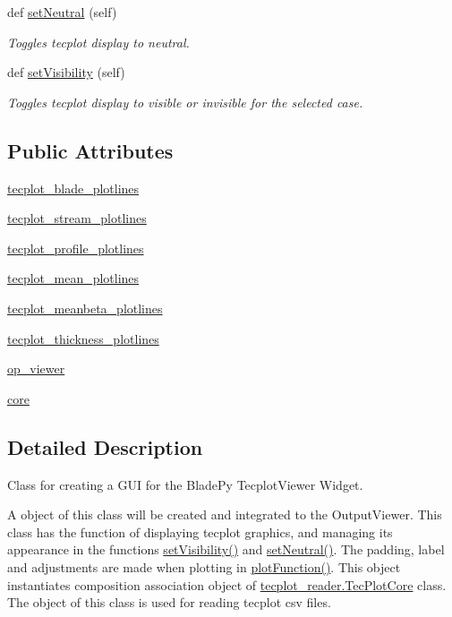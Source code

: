\begin{DoxyCompactItemize}
def \hyperlink{a00110_ad80163041f7884f536d1421860c4adc2}{set\+Neutral} (self)
\begin{DoxyCompactList}\small\item\em Toggles tecplot display to neutral. \end{DoxyCompactList}\item 
def \hyperlink{a00110_ae50e0f3c4051d791ed30a2e9de5233ea}{set\+Visibility} (self)
\begin{DoxyCompactList}\small\item\em Toggles tecplot display to visible or invisible for the selected case. \end{DoxyCompactList}\end{DoxyCompactItemize}
\subsection*{Public Attributes}
\begin{DoxyCompactItemize}
\item 
\hyperlink{a00110_a97bc6a6c7074f874028cd2afbbad4082}{tecplot\+\_\+blade\+\_\+plotlines}
\item 
\hyperlink{a00110_a103d285631a0d45198d834c8a98cf72a}{tecplot\+\_\+stream\+\_\+plotlines}
\item 
\hyperlink{a00110_a20a9b77de151d414f78ab14a5ee30143}{tecplot\+\_\+profile\+\_\+plotlines}
\item 
\hyperlink{a00110_ad430a4835103d6c1e22b1d81a829bc74}{tecplot\+\_\+mean\+\_\+plotlines}
\item 
\hyperlink{a00110_a552371e32854caef73cb7386140ebab8}{tecplot\+\_\+meanbeta\+\_\+plotlines}
\item 
\hyperlink{a00110_a3291e8bf0c5c69a20e3e9299dc363db2}{tecplot\+\_\+thickness\+\_\+plotlines}
\item 
\hyperlink{a00110_a03539a28f4d15d303da92341074ab6b6}{op\+\_\+viewer}
\item 
\hyperlink{a00110_a7d3fabc52fc4c2d52b9aa4efea25131a}{core}
\end{DoxyCompactItemize}


\subsection{Detailed Description}
Class for creating a G\+UI for the Blade\+Py Tecplot\+Viewer Widget. 

A object of this class will be created and integrated to the Output\+Viewer. This class has the function of displaying tecplot graphics, and managing its appearance in the functions \hyperlink{a00110_ae50e0f3c4051d791ed30a2e9de5233ea}{set\+Visibility()} and \hyperlink{a00110_ad80163041f7884f536d1421860c4adc2}{set\+Neutral()}. The padding, label and adjustments are made when plotting in \hyperlink{a00110_a62c9724fbeda8d8780e57559bada3282}{plot\+Function()}. This object instantiates composition association object of \hyperlink{a00118}{tecplot\+\_\+reader.\+Tec\+Plot\+Core} class. The object of this class is used for reading tecplot csv files.

